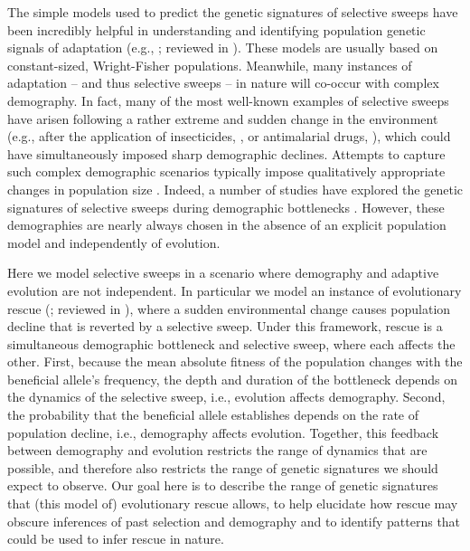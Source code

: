 \documentclass[]{article}
\begin{document}
The simple models used to predict the genetic signatures of selective sweeps have been incredibly helpful in understanding and identifying population genetic signals of adaptation (e.g., \citealp{smith1974hitch,kaplan1989hitchhiking}; reviewed in \citealp{stephan2019selective}). 
These models are usually based on constant-sized, Wright-Fisher populations.
Meanwhile, many instances of adaptation -- and thus selective sweeps -- in nature will co-occur with complex demography.
In fact, many of the most well-known examples of selective sweeps have arisen following a rather extreme and sudden change in the environment (e.g., after the application of insecticides, \citealp{sedghifar2016genomic}, or antimalarial drugs, \citealp{nair2003selective}), which could have simultaneously imposed sharp demographic declines.
Attempts to capture such complex demographic scenarios typically impose qualitatively appropriate changes in population size \citep[e.g.,][]{hermisson2005soft}.
Indeed, a number of studies have explored the genetic signatures of selective sweeps during demographic bottlenecks \citep[e.g.,][]{innan2004pattern,teshima2006reliable,wilson2014soft}.
However, these demographies are nearly always chosen in the absence of an explicit population model and independently of evolution.

Here we model selective sweeps in a scenario where demography and adaptive evolution are not independent.
In particular we model an instance of evolutionary rescue (\citealp{gomulkiewicz1995does}; reviewed in \citealp{bell2017evolutionary}), where a sudden environmental change causes population decline that is reverted by a selective sweep.
Under this framework, rescue is a simultaneous demographic bottleneck and selective sweep, where each affects the other.
First, because the mean absolute fitness of the population changes with the beneficial allele's frequency, the depth and duration of the bottleneck depends on the dynamics of the selective sweep, i.e., evolution affects demography.
Second, the probability that the beneficial allele establishes depends on the rate of population decline, i.e., demography affects evolution.
Together, this feedback between demography and evolution restricts the range of dynamics that are possible, and therefore also restricts the range of genetic signatures we should expect to observe.
Our goal here is to describe the range of genetic signatures that (this model of) evolutionary rescue allows, to help elucidate how rescue may obscure inferences of past selection and demography and to identify patterns that could be used to infer rescue in nature.
\end{document}
